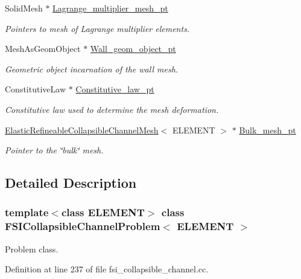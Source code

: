 \begin{DoxyCompactItemize}
Solid\+Mesh $\ast$ \hyperlink{classFSICollapsibleChannelProblem_a3a5aa5a00fbecec4bede0aee9af6b338}{Lagrange\+\_\+multiplier\+\_\+mesh\+\_\+pt}
\begin{DoxyCompactList}\small\item\em Pointers to mesh of Lagrange multiplier elements. \end{DoxyCompactList}\item 
Mesh\+As\+Geom\+Object $\ast$ \hyperlink{classFSICollapsibleChannelProblem_a884256a97060121c507ab9673f0ccef6}{Wall\+\_\+geom\+\_\+object\+\_\+pt}
\begin{DoxyCompactList}\small\item\em Geometric object incarnation of the wall mesh. \end{DoxyCompactList}\item 
Constitutive\+Law $\ast$ \hyperlink{classFSICollapsibleChannelProblem_a49de3f64c8f375c2709a2d0f5193cef3}{Constitutive\+\_\+law\+\_\+pt}
\begin{DoxyCompactList}\small\item\em Constitutive law used to determine the mesh deformation. \end{DoxyCompactList}\item 
\hyperlink{classElasticRefineableCollapsibleChannelMesh}{Elastic\+Refineable\+Collapsible\+Channel\+Mesh}$<$ E\+L\+E\+M\+E\+NT $>$ $\ast$ \hyperlink{classFSICollapsibleChannelProblem_ac7c827b880d5499b8c3c4c3c37d6a3c9}{Bulk\+\_\+mesh\+\_\+pt}
\begin{DoxyCompactList}\small\item\em Pointer to the \char`\"{}bulk\char`\"{} mesh. \end{DoxyCompactList}\end{DoxyCompactItemize}


\subsection{Detailed Description}
\subsubsection*{template$<$class E\+L\+E\+M\+E\+NT$>$\newline
class F\+S\+I\+Collapsible\+Channel\+Problem$<$ E\+L\+E\+M\+E\+N\+T $>$}

Problem class. 

Definition at line 237 of file fsi\+\_\+collapsible\+\_\+channel.\+cc.



